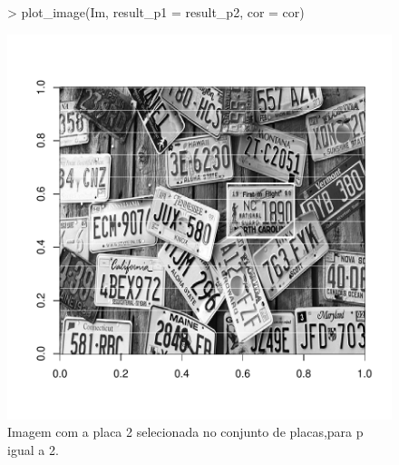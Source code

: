 \documentclass[12pt]{article}
\begin{document}
\begin{figure}
\centering
\begin{Schunk}
\begin{Sinput}
> plot_image(Im, result_p1 = result_p2, cor = cor)
\end{Sinput}
\end{Schunk}
\includegraphics{template_matching-022}
\caption{Imagem com a placa 2 selecionada no conjunto de placas,para p igual a 2.}
\label{placa1selecionada}
\end{figure}
\end{document}
